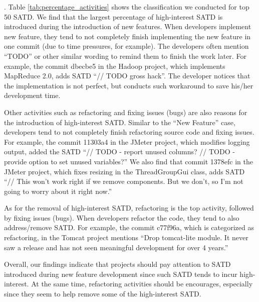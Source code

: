 \documentclass[10pt, conference]{IEEEtran}
\newcommand{\emad}[1]{{\color{red}{\textbf{Emad: [#1]}}}}
\newcommand{\smallsection}[1]{\vspace{1mm}\noindent {\bf #1}.\hspace{2mm}}
\begin{document}


\smallsection{Results}
Table \ref{tab:percentage_activities} shows the classification we conducted for top 50 SATD. We find that the largest percentage of high-interest SATD is introduced during the introduction of new features. When developers implement new feature, they tend to not completely finish implementing the new feature in one commit (due to time pressures, for example). The developers often mention ``TODO'' or other similar wording to remind them to finish the work later. For example, the commit dbecbe5 in the Hadoop project, which implements MapReduce 2.0, adds SATD ``// TODO gross hack''. The developer notices that the implementation is not perfect, but conducts such workaround to save his/her development time.

Other activities such as refactoring and fixing issues (bugs) are also reasons for the introduction of high-interest SATD. Similar to the ``New Feature'' case, developers tend to not completely finish refactoring source code and fixing issues. For example, the commit 11303a4 in the JMeter project, which modifies logging output, added the SATD ``// TODO - report unused columns? // TODO - provide option to set unused variables?'' We also find that commit 1378efc in the JMeter project, which fixes resizing in the ThreadGroupGui class, adds SATD ``// This won't work right if we remove components. But we don't, so I'm not going to worry about it right now.''



As for the removal of high-interest SATD, refactoring is the top activity, followed by fixing issues (bugs). When developers refactor the code, they tend to also address/remove SATD. For example, the commit c77f96a, which is categorized as refactoring, in the Tomcat project mentions ``Drop tomcat-lite module. It never saw a release and has not seen meaningful development for over 4 years.''

Overall, our findings indicate that projects should pay attention to SATD introduced during new feature development since such SATD tends to incur high-interest. At the same time, refactoring activities should be encourages, especially since they seem to help remove some of the high-interest SATD.
\end{document}
